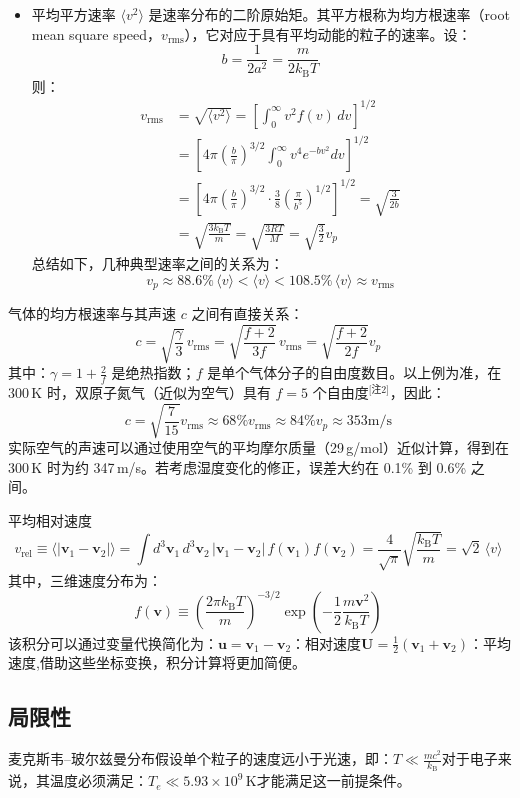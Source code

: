 \begin{itemize}
\item 平均平方速率 $\langle v^2 \rangle$ 是速率分布的二阶原始矩。其平方根称为均方根速率（root mean square speed，$v_{\text{rms}}$），它对应于具有平均动能的粒子的速率。设：
$$
b = \frac{1}{2a^2} = \frac{m}{2k_{\text{B}}T}~
$$
则：
$$
\begin{aligned}
v_{\text{rms}} &= \sqrt{\langle v^2 \rangle} = \left[\int_0^\infty v^2 f(v)\, dv\right]^{1/2} \\
&= \left[ 4\pi \left( \frac{b}{\pi} \right)^{3/2} \int_0^\infty v^4 e^{-bv^2} dv \right]^{1/2} \\
&= \left[ 4\pi \left( \frac{b}{\pi} \right)^{3/2} \cdot \frac{3}{8} \left( \frac{\pi}{b^5} \right)^{1/2} \right]^{1/2}= \sqrt{\frac{3}{2b}} \\
&= \sqrt{\frac{3k_{\text{B}}T}{m}} = \sqrt{\frac{3RT}{M}} = \sqrt{\frac{3}{2}}v_p
\end{aligned}~
$$
总结如下，几种典型速率之间的关系为：
$$
v_p \approx 88.6\%\, \langle v \rangle < \langle v \rangle < 108.5\%\, \langle v \rangle \approx v_{\text{rms}}~
$$
\end{itemize}
气体的均方根速率与其声速 $c$ 之间有直接关系：
$$
c = \sqrt{\frac{\gamma}{3}}\, v_{\mathrm{rms}} = \sqrt{\frac{f + 2}{3f}}\, v_{\mathrm{rms}} = \sqrt{\frac{f + 2}{2f}} v_p~
$$
其中：$\gamma = 1 + \frac{2}{f}$ 是绝热指数；$f$ 是单个气体分子的自由度数目。以上例为准，在 300 K 时，双原子氮气（近似为空气）具有 $f = 5$ 个自由度\(^\text{[注2]}\)，因此：
$$
c = \sqrt{\frac{7}{15}} v_{\mathrm{rms}} \approx 68\% v_{\mathrm{rms}} \approx 84\% v_p \approx 353 \mathrm{m/s}~
$$
实际空气的声速可以通过使用空气的平均摩尔质量（29 g/mol）近似计算，得到在 300 K 时为约 347 m/s。若考虑湿度变化的修正，误差大约在 0.1\% 到 0.6\% 之间。

平均相对速度
$$
v_{\text{rel}} \equiv \langle |\mathbf{v}_1 - \mathbf{v}_2| \rangle = \int d^3\mathbf{v}_1\, d^3\mathbf{v}_2\, |\mathbf{v}_1 - \mathbf{v}_2|\, f(\mathbf{v}_1) f(\mathbf{v}_2) = \frac{4}{\sqrt{\pi}} \sqrt{\frac{k_{\text{B}} T}{m}} = \sqrt{2}\, \langle v \rangle~
$$
其中，三维速度分布为：
$$
f(\mathbf{v}) \equiv \left( \frac{2\pi k_{\text{B}} T}{m} \right)^{-3/2} \exp\left( -\frac{1}{2} \frac{m \mathbf{v}^2}{k_{\text{B}} T} \right)~
$$
该积分可以通过变量代换简化为：$\mathbf{u} = \mathbf{v}_1 - \mathbf{v}_2$：相对速度$\mathbf{U} = \tfrac{1}{2}(\mathbf{v}_1 + \mathbf{v}_2)$：平均速度,借助这些坐标变换，积分计算将更加简便。
\subsection{局限性}
麦克斯韦–玻尔兹曼分布假设单个粒子的速度远小于光速，即：$T \ll \frac{mc^2}{k_{\text{B}}}$对于电子来说，其温度必须满足：$T_e \ll 5.93 \times 10^9\, \mathrm{K}$才能满足这一前提条件。
